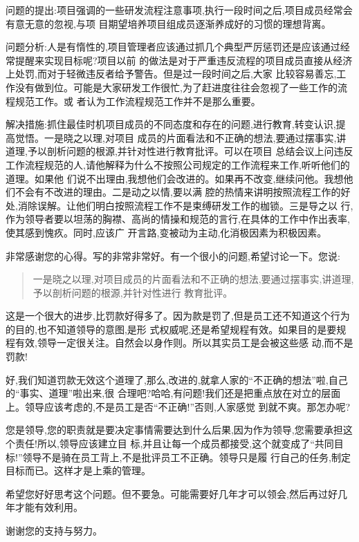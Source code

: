 \documentclass[11pt]{article}
\begin{document}
\begin{staff}

  \slogo 问题的提出:项目强调的一些研发流程注意事项,执行一段时间之后,项目成员经常会有意无意的忽视,与项
  目期望培养项目组成员逐渐养成好的习惯的理想背离。

  问题分析:人是有惰性的,项目管理者应该通过抓几个典型严厉惩罚还是应该通过经常提醒来实现目标呢?项目以前
  的做法是对于严重违反流程的项目成员直接从经济上处罚,而对于轻微违反者给予警告。但是过一段时间之后,大家
  比较容易善忘,工作没有做到位。可能是大家研发工作很忙,为了赶进度往往会忽视了一些工作的流程规范工作。或
  者认为工作流程规范工作并不是那么重要。

  解决措施:抓住最佳时机项目成员的不同态度和存在的问题,进行教育,转变认识,提高觉悟。一是晓之以理,对项目
  成员的片面看法和不正确的想法,要通过摆事实,讲道理,予以剖析问题的根源,并针对性进行教育批评。可以在项目
  总结会议上问违反工作流程规范的人,请他解释为什么不按照公司规定的工作流程来工作,听听他们的道理。如果他
  们说不出理由,我想他们会改进的。如果再不改变,继续问他。我想他们不会有不改进的理由。二是动之以情,要以满
  腔的热情来讲明按照流程工作的好处,消除误解。让他们明白按照流程工作不是束缚研发工作的枷锁。三是导之以
  行,作为领导者要以坦荡的胸襟、高尚的情操和规范的言行,在具体的工作中作出表率,使其感到愧疚。同时,应该广
  开言路,变被动为主动,化消极因素为积极因素。
\end{staff}

\begin{yang}

\ylogo 非常感谢您的心得。写的非常非常好。有一个很小的问题,希望讨论一下。您说:

\begin{quote}
  一是晓之以理,对项目成员的片面看法和不正确的想法,要通过摆事实,讲道理,予以剖析问题的根源,并针对性进行
  教育批评。
\end{quote}

这是一个很大的进步,比罚款好得多了。因为款是罚了,但是员工还不知道这个行为的目的,也不知道领导的意图,是形
式权威呢,还是希望规程有效。如果目的是要规程有效,领导一定很关注。自然会以身作则。所以其实员工是会被这些感
动,而不是罚款!

好,我们知道罚款无效这个道理了,那么,改进的,就拿人家的``不正确的想法''啦,自己的``事实、道理''啦出来,很
合理吧?哈哈,有问题!我们还是把重点放在对立的层面上。领导应该考虑的,不是员工是否``不正确!''否则,人家感觉
到就不爽。那怎办呢?

您是领导,您的职责就是要决定事情需要达到什么后果,因为作为领导,您需要承担这个责任!所以,领导应该建立目
标,并且让每一个成员都接受,这个就变成了``共同目标!''领导不是骑在员工背上,不是批评员工不正确。领导只是履
行自己的任务,制定目标而已。这样才是上乘的管理。

希望您好好思考这个问题。但不要急。可能需要好几年才可以领会,然后再过好几年才能有效利用。

谢谢您的支持与努力。
\end{yang}
\end{document}
